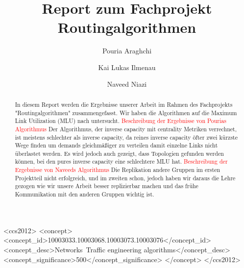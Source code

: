 \documentclass[sigconf, nonacm, review]{acmart}
\begin{document}
\title{Report zum Fachprojekt Routingalgorithmen}
\author{Pouria Araghchi}

\author{Kai Lukas Ilmenau}

\author{Naveed Niazi}

\renewcommand{\shortauthors}{Araghchi, Ilmenau, Niazi}

\begin{abstract}
In diesem Report werden die Ergebnisse unserer Arbeit im Rahmen des Fachprojekts "Routingalgorithmen" zusammengefasst.
Wir haben die Algorithmen auf die Maximum Link Utilization (MLU) nach \cite{foerster2021} untersucht.
\textcolor{red}{Beschreibung der Ergebnisse von Pourias Algorithmus}
Der Algorithmus, der inverse capacity mit centrality Metriken verrechnet, ist meistens schlechter als inverse capacity, 
da reines inverse capacity \"ofter zwei k\"urzste Wege finden um demands gleichm\"a\ss iger zu verteilen damit einzelne Links nicht \"uberlastet werden.
Es wird jedoch auch gezeigt, dass Topologien gefunden werden k\"onnen, bei den pures inverse capacity eine schlechtere MLU hat.
\textcolor{red}{Beschreibung der Ergebnisse von Naveeds Algorithmus}
Die Replikation andere Gruppen im ersten Projektteil nicht erfolgreich, und im zweiten schon, 
jedoch haben wir daraus die Lehre gezogen wie wir unsere Arbeit besser replizierbar machen und das fr\"uhe Kommunikation mit den anderen Gruppen wichtig ist.
\end{abstract}

\begin{CCSXML}
<ccs2012>
<concept>
<concept_id>10003033.10003068.10003073.10003076</concept_id>
<concept_desc>Networks~Traffic engineering algorithms</concept_desc>
<concept_significance>500</concept_significance>
</concept>
</ccs2012>
\end{CCSXML}

\end{document}
